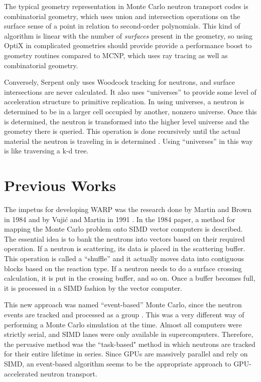 The typical geometry representation in Monte Carlo neutron transport codes is combinatorial geometry, which uses union and intersection operations on the surface sense  of a point in relation to second-order polynomials.  This kind of algorithm is linear with the number of \emph{surfaces} present in the geometry, so using OptiX in complicated geometries should provide provide a performance boost to geometry routines compared to MCNP, which uses ray tracing as well as combinatorial geometry.  

Conversely, Serpent only uses Woodcock tracking for neutrons, and surface intersections are never calculated.  It also uses ``universes'' to provide some level of acceleration structure to primitive replication.  In using universes, a neutron is determined to be in a larger cell occupied by another, nonzero universe. %
 Once this is determined, the neutron is transformed into the higher level universe and the geometry there is queried.  This operation is done recursively until the actual material the neutron is traveling in is determined \cite{jaakko}.  Using ``universes'' in this way is like traversing a k-d tree.


\section{Previous Works}

The impetus for developing WARP was the research done by Martin and Brown in 1984 \cite{vector} and by Vuji\'{c} and Martin in 1991 \cite{vujic_vector}.  In the 1984 paper, a method for mapping the Monte Carlo problem onto SIMD vector computers is described.  The essential idea is to bank the neutrons into vectors based on their required operation.  If a neutron is scattering, its data is placed in the scattering buffer.  This operation is called a ``shuffle'' and it actually moves data into contiguous blocks based on the reaction type.  If a neutron needs to do a surface crossing calculation, it is put in the crossing buffer, and so on.  Once a buffer becomes full, it is processed in a SIMD fashion by the vector computer.  

This new approach was named ``event-based'' Monte Carlo, since the neutron events are tracked and processed as a group \cite{vector}.  This was a very different way of performing a Monte Carlo simulation at the time.  Almost all computers were strictly serial, and SIMD lanes were only available in supercomputers.  Therefore, the pervasive method was the ``task-based" method in which neutrons are tracked for their entire lifetime in series.  Since GPUs are massively parallel and rely on SIMD, an event-based algorithm seems to be the appropriate approach to GPU-accelerated neutron transport.  

